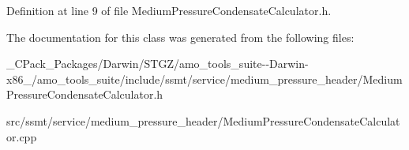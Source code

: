 Definition at line 9 of file Medium\+Pressure\+Condensate\+Calculator.\+h.



The documentation for this class was generated from the following files\+:\begin{DoxyCompactItemize}
\item 
\+\_\+\+C\+Pack\+\_\+\+Packages/\+Darwin/\+S\+T\+G\+Z/amo\+\_\+tools\+\_\+suite-\/-\/\+Darwin-\/x86\+\_/amo\+\_\+tools\+\_\+suite/include/ssmt/service/medium\+\_\+pressure\+\_\+header/Medium\+Pressure\+Condensate\+Calculator.\+h\item 
src/ssmt/service/medium\+\_\+pressure\+\_\+header/Medium\+Pressure\+Condensate\+Calculator.\+cpp\end{DoxyCompactItemize}
